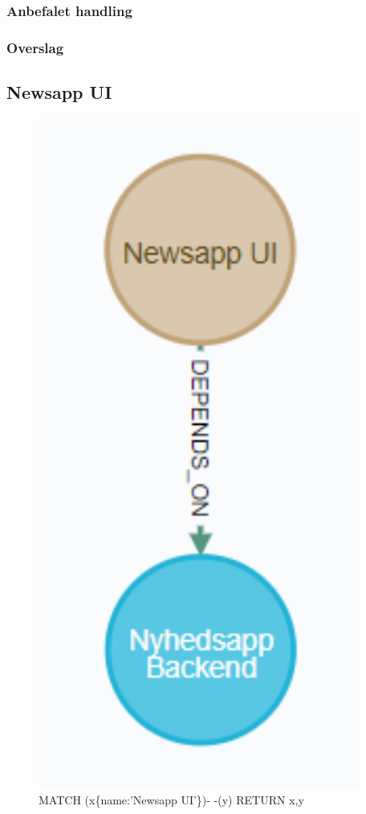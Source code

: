 \documentclass{article}
\begin{document}
\subsubsection{Anbefalet handling}
\subsubsection{Overslag}


\subsection{Newsapp UI}
\begin{figure}[h]
\includegraphics[width=300pt]{NyhedsAppUi.PNG}
\caption{MATCH (x\{name:'Newsapp UI'\})- -(y) RETURN x,y}
\end{figure}
\end{document}
